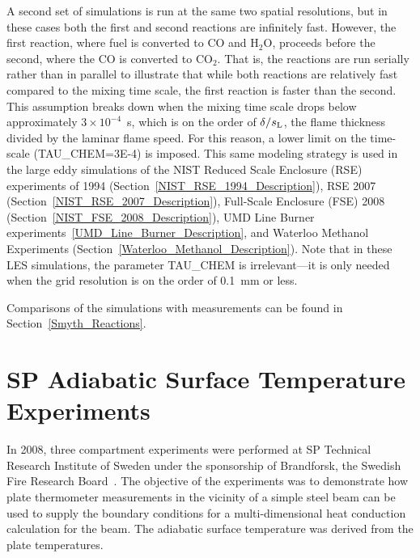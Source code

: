 A second set of simulations is run at the same two spatial resolutions, but in these cases both the first and second reactions are infinitely fast. However, the first reaction, where fuel is converted to CO and H$_2$O, proceeds before the second, where the CO is converted to CO$_2$. That is, the reactions are run serially rather than in parallel to illustrate that while both reactions are relatively fast compared to the mixing time scale, the first reaction is faster than the second. This assumption breaks down when the mixing time scale drops below approximately $3 \times 10^{-4}$~s, which is on the order of $\delta/s_{\rm L}$, the flame thickness divided by the laminar flame speed. For this reason, a lower limit on the time-scale ({\ct TAU\_CHEM=3E-4}) is imposed. This same modeling strategy is used in the large eddy simulations of the NIST Reduced Scale Enclosure (RSE) experiments of 1994 (Section~\ref{NIST_RSE_1994_Description}), RSE 2007 (Section~\ref{NIST_RSE_2007_Description}), Full-Scale Enclosure (FSE) 2008 (Section~\ref{NIST_FSE_2008_Description}), UMD Line Burner experiments~\ref{UMD_Line_Burner_Description}, and Waterloo Methanol Experiments (Section~\ref{Waterloo_Methanol_Description}). Note that in these LES simulations, the parameter {\ct TAU\_CHEM} is irrelevant---it is only needed when the grid resolution is on the order of 0.1~mm or less.

Comparisons of the simulations with measurements can be found in Section~\ref{Smyth_Reactions}.


\section{SP Adiabatic Surface Temperature Experiments}
\label{SP_AST_Description}

In 2008, three compartment experiments were performed at SP Technical Research Institute of Sweden under the sponsorship of Brandforsk, the Swedish Fire Research Board~\cite{Wickstrom_AST}. The objective of the experiments was to demonstrate how plate thermometer measurements in the vicinity of a simple steel beam can be used to supply the boundary conditions for a multi-dimensional heat conduction calculation for the beam. The adiabatic surface temperature was derived from the plate temperatures.

